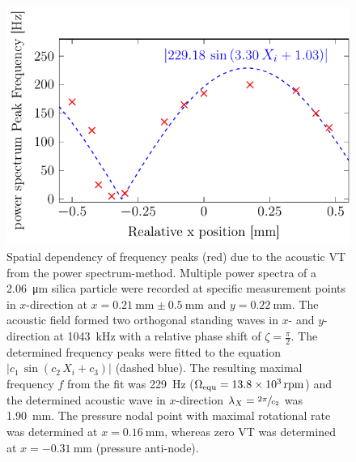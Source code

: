 \begin{figure}[tb]
  \centering
  \includegraphics[]{External/VT_results.pdf}




    \caption{Spatial dependency of frequency peaks (red) due to the acoustic VT 
      from the power spectrum-method. Multiple power spectra of a 
      \SI{2.06}{\micro\meter} silica particle were recorded at specific 
      measurement points in $x$-direction at $x=\SI{0.21}{\mm}\pm\SI{0.5}{\mm}$ 
      and $y=\SI{0.22}{\mm}$. The acoustic field formed two orthogonal standing 
      waves in $x$- and $y$-direction at \SI{1043}{\kilo\hertz} with a relative 
      phase shift of $\zeta =\frac{\pi}{2}$. The determined frequency peaks were 
      fitted to the equation $\left|c_{1}\,\sin(c_2\,X_i + c_3)\right|$ (dashed 
      blue).  The resulting maximal frequency $f$  from the fit was 
      \SI{229}{\hertz} ($ \Omega_{\mathrm{equ}} = \SI{13.8e3}{rpm}$) and the determined 
      acoustic wave in $x$-direction $\lambda_{X}=\sfrac{2\pi}{c_2}$ was 
    \SI{1.90}{\mm}. The pressure nodal point with maximal rotational rate was 
  determined at $x=\SI{0.16}{\mm}$, whereas zero VT was determined at 
$x=\SI{-0.31}{\mm}$ (pressure anti-node).\label{fig:VT-Fig10}}
\end{figure}
